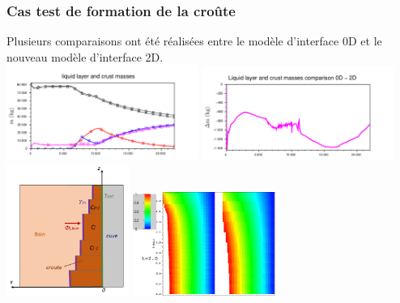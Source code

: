 \documentclass{beamer}
\begin{document}
\begin{frame}[t,noframenumbering]
    \frametitle{Cas test de formation de la croûte}
\footnotesize
    Plusieurs comparaisons ont été réalisées entre le modèle d'interface 0D et le nouveau modèle d'interface 2D.\\
   \includegraphics[width=0.47\textwidth]{Figures/IndustrialTestmasses2.pdf}
    \includegraphics[width=0.47\textwidth]{Figures/IndustrialTestdiffMasses2.pdf}\\

 \center\includegraphics[width=0.3\textwidth]{Figures/modele_croute_0D.png}
 \includegraphics[width=0.35\textwidth]{Figures/Full2D_Bi1_2_t200002.png}
    
\end{frame}
\end{document}
